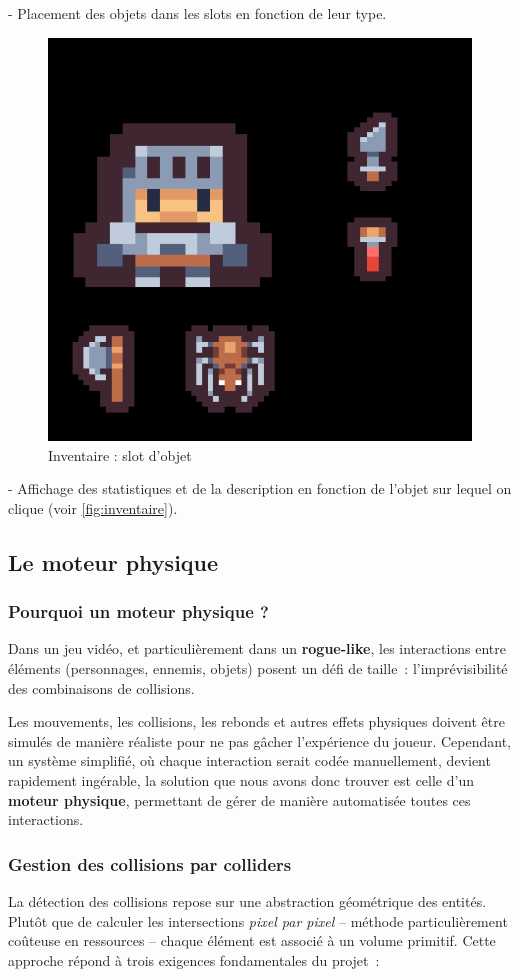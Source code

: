 \documentclass[a4paper,11pt]{article}
\begin{document}
   - Placement des objets dans les slots en fonction de leur type.

\begin{figure}[ht]
    \centering 
    \includegraphics[width=0.2\linewidth]{./img/itemslot.png} 
    \caption{Inventaire : slot d'objet} 
\end{figure}

   - Affichage des statistiques et de la description en fonction de l'objet sur lequel on clique (voir \autoref{fig:inventaire}).




\newpage

\subsection{Le moteur physique}



\subsubsection{Pourquoi un moteur physique ?}
\label{sec:moteur_physique}

Dans un jeu vidéo, et particulièrement dans un \textbf{rogue-like}, les interactions entre éléments (personnages, ennemis, objets) posent un défi de taille~: l'imprévisibilité des combinaisons de collisions. 

Les mouvements, les collisions, les rebonds et autres effets physiques doivent être simulés de manière réaliste pour ne pas gâcher l’expérience du joueur. Cependant, un système simplifié, où chaque interaction serait codée manuellement, devient rapidement ingérable, la solution que nous avons donc trouver est celle d'un \textbf{moteur physique}, permettant de gérer de manière automatisée toutes ces interactions.


\subsubsection{Gestion des collisions par colliders} 
\label{sec:colliders}
La détection des collisions repose sur une abstraction géométrique des entités. Plutôt que de calculer les intersections \textit{pixel par pixel} -- méthode particulièrement coûteuse en ressources -- chaque élément est associé à un volume primitif. Cette approche répond à trois exigences fondamentales du projet~:
\end{document}
